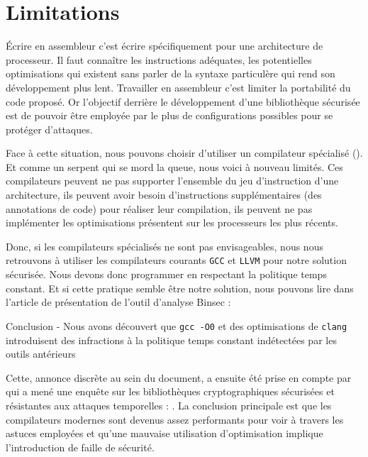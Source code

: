 \section{Limitations}
\label{sect:limitations}

Écrire en assembleur c'est écrire spécifiquement pour une architecture de processeur. Il faut connaître les instructions adéquates, les potentielles optimisations qui existent sans parler de la syntaxe particulère qui rend son développement plus lent. Travailler en assembleur c'est limiter la portabilité du code proposé. Or l'objectif derrière le développement d'une bibliothèque sécurisée est de pouvoir être employée par le plus de configurations possibles pour se protéger d'attaques.\smallbreak

Face à cette situation, nous pouvons choisir d'utiliser un compilateur spécialisé (\cite{Borrello_2021, Raccoon}). Et comme un serpent qui se mord la queue, nous voici à nouveau limités. Ces compilateurs peuvent ne pas supporter l'ensemble du jeu d'instruction d'une architecture, ils peuvent avoir besoin d'instructions supplémentaires (des annotations de code) pour réaliser leur compilation, ils peuvent ne pas implémenter les optimisations présentent sur les processeurs les plus récents.\smallbreak

Donc, si les compilateurs spécialisés ne sont pas envisageables, nous nous retrouvons à utiliser les compilateurs courants \texttt{GCC} et \texttt{LLVM} pour notre solution sécurisée. Nous devons donc programmer en respectant la politique temps constant. Et si cette pratique semble être notre solution, nous pouvons lire dans l'article de présentation de l'outil d'analyse Binsec  : 
\begin{CitationBox}{Conclusion - \cite{binsecRel2019}}
Nous avons découvert que \texttt{gcc -O0} et des optimisations de \texttt{clang} introduisent des infractions à la politique temps constant indétectées par les outils antérieurs
\end{CitationBox}\smallbreak

Cette, annonce discrète au sein du document, a ensuite été prise en compte par \citeauthor{schneider2024breakingbadcompilersbreak} qui a mené une enquête sur les bibliothèques cryptographiques sécurisées et résistantes aux attaques temporelles : \cite{schneider2024breakingbadcompilersbreak}. La conclusion principale est que les compilateurs modernes sont devenus assez performants pour voir à travers les astuces employées et qu'une mauvaise utilisation d'optimisation implique l'introduction de faille de sécurité. \smallbreak

